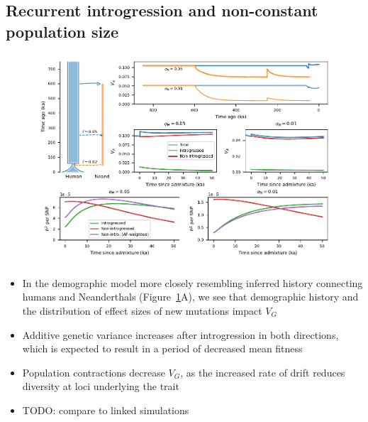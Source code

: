 \documentclass{article}
\begin{document}
\subsection*{Recurrent introgression and non-constant population size}

\begin{figure}[t!]
    \centering
    \includegraphics{../figures/neanderthal_admixture.pdf}
    \caption{
        \textbf{}
    }
    \label{fig:neand-to-human}
\end{figure}

\begin{itemize}
    \item In the demographic model more closely resembling inferred history
        connecting humans and Neanderthals (Figure~\ref{fig:neand-to-human}A),
        we see that demographic history and the distribution of effect sizes
        of new mutations impact $V_G$
    \item Additive genetic variance increases after introgression in both directions,
        which is expected to result in a period of decreased mean fitness
    \item Population contractions decrease $V_G$, as the increased rate of drift
        reduces diversity at loci underlying the trait
    \item TODO: compare to linked simulations
\end{itemize}
\end{document}
